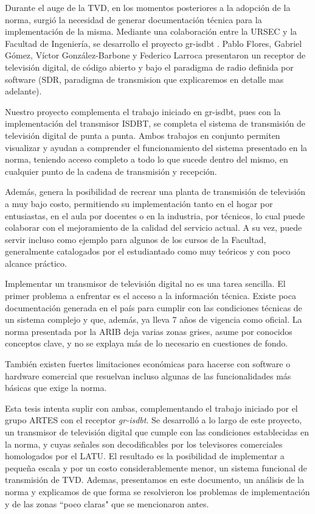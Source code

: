Durante el auge de la TVD, en los momentos posteriores a la adopción de la norma, surgió la necesidad de generar documentación técnica para la implementación de la misma. Mediante una colaboración entre la URSEC y la Facultad de Ingeniería, se desarrollo el proyecto gr-isdbt \cite{winCom16}. Pablo Flores, Gabriel Gómez, Víctor González-Barbone y Federico Larroca presentaron un receptor de televisión digital, de código abierto y bajo el paradigma de radio definida por software (SDR, paradigma de transmision que explicaremos en detalle mas adelante).

Nuestro proyecto complementa el trabajo iniciado en gr-isdbt, pues con la implementación del transmisor ISDBT, se completa el sistema de transmisión de televisión digital de punta a punta. Ambos trabajos en conjunto permiten visualizar y ayudan a comprender el funcionamiento del sistema presentado en la norma, teniendo acceso completo a todo lo que sucede dentro del mismo, en cualquier punto de la cadena de transmisión y recepción. 

Además, genera la posibilidad de recrear una planta de transmisión de televisión a muy bajo costo, permitiendo su implementación tanto en el hogar por entusiastas, en el aula por docentes o en la industria, por técnicos, lo cual puede colaborar con el mejoramiento de la calidad del servicio actual. A su vez, puede servir incluso como ejemplo para algunos de los cursos de la Facultad, generalmente catalogados por el estudiantado como muy teóricos y con poco alcance práctico. 

Implementar un transmisor de televisión digital no es una tarea sencilla. El primer problema a enfrentar es el acceso a la información técnica. Existe poca documentación generada en el país para cumplir con las condiciones técnicas de un sistema complejo y que, además, ya lleva 7 años de vigencia como oficial. La norma presentada por la ARIB deja varias zonas grises, asume por conocidos conceptos clave, y no se explaya más de lo necesario en cuestiones de fondo. 

También existen fuertes limitaciones económicas para hacerse con software o hardware comercial que resuelvan incluso algunas de las funcionalidades más básicas que exige la norma. 

Esta tesis intenta suplir con ambas, complementando el trabajo iniciado por el grupo ARTES con el receptor \textit{gr-isdbt}. Se desarrolló a lo largo de este proyecto, un transmisor de televisión digital que cumple con las condiciones establecidas en la norma, y cuyas señales son decodificables por los televisores comerciales homologados por el LATU. El resultado es la posibilidad de implementar a pequeña escala y por un costo considerablemente menor, un sistema funcional de transmisión de TVD. Ademas, presentamos en este documento, un análisis de la norma y explicamos de que forma se resolvieron los problemas de implementación y de las zonas ``poco claras" que se mencionaron antes.

